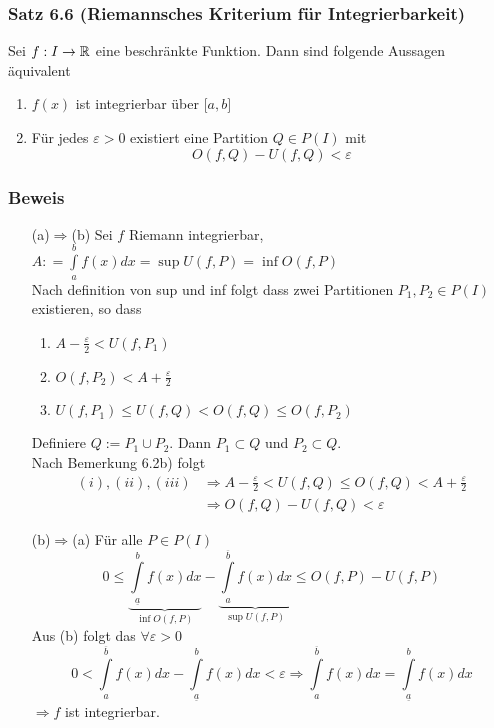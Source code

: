 \subsubsection*{Satz 6.6 (Riemannsches Kriterium für Integrierbarkeit)}
Sei $f:I\to\mathbb{R}$ eine beschränkte Funktion. Dann sind folgende Aussagen äquivalent
\begin{enumerate}
\item $f(x)$ ist integrierbar über $\lbrack a,b\rbrack$
\item Für jedes $\varepsilon>0$ existiert eine Partition $Q\in P(I)$ mit \[O(f,Q)-U(f,Q)<\varepsilon\]
\end{enumerate}
\subsubsection*{Beweis}




\begin{enumerate}[align=left]
\item[(a)$\Rightarrow$(b)] Sei $f$ Riemann integrierbar, $A: = \int\limits_a^b {f(x)dx = \sup U(f,P) = \inf O(f,P)}$\\
Nach definition von sup und inf folgt dass zwei Partitionen $P_1,P_2\in P(I)$ existieren, so dass 

\begin{enumerate}[\indent $(i)$]
\item $A-\frac{\varepsilon}{2}<U(f,P_1)$
\item $O(f,P_2)<A+\frac{\varepsilon}{2}$
\item $U(f,P_1) \leq U(f,Q) < O(f,Q) \leq O(f,P_2)$ 
\end{enumerate} 

Definiere $Q:=P_1\cup P_2$. Dann $P_1\subset Q$ und $P_2 \subset Q$.\\
Nach Bemerkung 6.2b) folgt
\begin{align*}
(i),(ii),(iii)&\Rightarrow A-\frac{\varepsilon}{2}<U(f,Q)\leq O(f,Q)<A+\frac{\varepsilon}{2}\\
&\Rightarrow O(f,Q)-U(f,Q) < \varepsilon
\end{align*}
\item[(b)$\Rightarrow$(a)] Für alle $P\in P(I)$ \[0 \le \underbrace {\int\limits_{\underline{a}}^b {f(x)dx} }_{\inf O(f,P)} - \underbrace {\int\limits_a^{\overline{b}} {f(x)dx} }_{\sup U(f,P)} \le O(f,P) - U(f,P)\]
Aus (b) folgt das $\forall\varepsilon>0$ \[0 < \int\limits_a^{\overline{b}} {f(x)dx - \int\limits_{\underline{a}}^b {f(x)dx < \varepsilon } } \Rightarrow \int\limits_a^{\overline{b}} {f(x)dx = \int\limits_{\underline{a}}^b {f(x)dx} } \] $\Rightarrow f$ ist integrierbar.
\end{enumerate}


